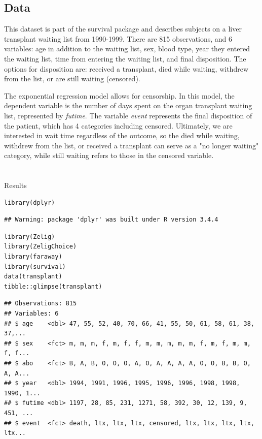 \documentclass[
]{article}
\begin{document}
\hypertarget{data}{%
\subsection{Data}\label{data}}

This dataset is part of the survival package and describes subjects on a
liver transplant waiting list from 1990-1999. There are 815
observations, and 6 variables: age in addition to the waiting list, sex,
blood type, year they entered the waiting list, time from entering the
waiting list, and final disposition. The options for disposition are:
received a transplant, died while waiting, withdrew from the list, or
are still waiting (censored).

The exponential regression model allows for censorship. In this model,
the dependent variable is the number of days spent on the organ
transplant waiting list, represented by \emph{futime}. The variable
\emph{event} represents the final disposition of the patient, which has
4 categories including censored. Ultimately, we are interested in wait
time regardless of the outcome, so the died while waiting, withdrew from
the list, or received a transplant can serve as a "no longer waiting"
category, while still waiting refers to those in the
\textquotesingle censored\textquotesingle{} variable.

\hypertarget{section}{%
\section{}\label{section}}

Results

\begin{verbatim}
library(dplyr)
\end{verbatim}

\begin{verbatim}
## Warning: package 'dplyr' was built under R version 3.4.4
\end{verbatim}

\begin{verbatim}
library(Zelig)
library(ZeligChoice)
library(faraway)
library(survival)
data(transplant)
tibble::glimpse(transplant)
\end{verbatim}

\begin{verbatim}
## Observations: 815
## Variables: 6
## $ age    <dbl> 47, 55, 52, 40, 70, 66, 41, 55, 50, 61, 58, 61, 38, 37,...
## $ sex    <fct> m, m, m, f, m, f, f, m, m, m, m, m, f, m, f, m, m, f, f...
## $ abo    <fct> B, A, B, O, O, O, A, O, A, A, A, A, O, O, B, B, O, A, A...
## $ year   <dbl> 1994, 1991, 1996, 1995, 1996, 1996, 1998, 1998, 1990, 1...
## $ futime <dbl> 1197, 28, 85, 231, 1271, 58, 392, 30, 12, 139, 9, 451, ...
## $ event  <fct> death, ltx, ltx, ltx, censored, ltx, ltx, ltx, ltx, ltx...
\end{verbatim}
\end{document}
